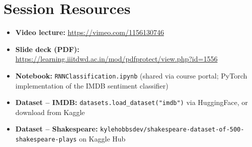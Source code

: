 \documentclass[12pt,a4paper]{article}
\begin{document}
\newpage
\section*{Session Resources}

\begin{itemize}
  \item \textbf{Video lecture:}
        \url{https://vimeo.com/1156130746}
  \item \textbf{Slide deck (PDF):}
        \url{https://learning.iiitdwd.ac.in/mod/pdfprotect/view.php?id=1556}
  \item \textbf{Notebook:} \texttt{RNNClassification.ipynb}
        (shared via course portal; PyTorch implementation of the
        IMDB sentiment classifier)
  \item \textbf{Dataset -- IMDB:}
        \texttt{datasets.load\_dataset("imdb")} via HuggingFace, or
        download from Kaggle
  \item \textbf{Dataset -- Shakespeare:}
        \texttt{kylehobbsdev/shakespeare-dataset-of-500-shakespeare-plays}
        on Kaggle Hub
\end{itemize}
\end{document}
